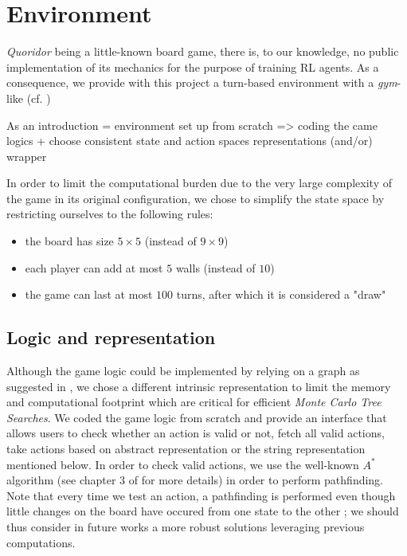 \documentclass[journal, a4paper]{IEEEtran}
\begin{document}
\section{Environment}
\label{sec:environment}

 \textit{Quoridor} being a little-known board game, there is, to our knowledge, no public implementation of its mechanics for the purpose of training RL agents. As a consequence, we provide with this project a turn-based environment with a \textit{gym}-like (cf. \cite{openai-gym})

As an introduction = environment set up from scratch => coding the came logics + choose consistent state and action spaces representations (and/or) wrapper

In order to limit the computational burden due to the very large complexity of the game in its original configuration, we chose to simplify the state space by restricting ourselves to the following rules:
\begin{itemize}
    \item the board has size $5\times 5$ (instead of $9\times 9$)
    \item each player can add at most $5$ walls (instead of $10$)
    \item the game can last at most $100$ turns, after which it is considered a "draw"
\end{itemize}

\subsection{Logic and representation}
\label{ssec:game-logic}

Although the game logic could be implemented by relying on a graph as suggested in \cite{heuristic-agent}, we chose a different intrinsic representation to limit the memory and computational footprint which are critical for efficient \textit{Monte Carlo Tree Searches}. We coded the game logic from scratch and provide an interface that allows users to check whether an action is valid or not, fetch all valid actions, take actions based on abstract representation or the string representation mentioned below. In order to check valid actions, we use the well-known $A^*$ algorithm (see chapter 3 of \cite{russel2010} for more details) in order to perform pathfinding. Note that every time we test an action, a pathfinding is performed even though little changes on the board have occured from one state to the other ; we should thus consider in future works a more robust solutions leveraging previous computations.
\end{document}
